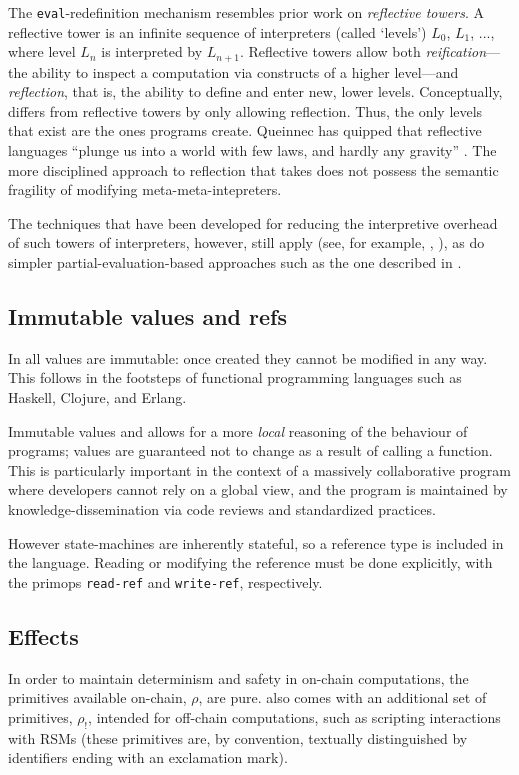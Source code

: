 The \texttt{eval}-redefinition mechanism resembles prior work on
\emph{reflective towers}. A reflective tower is an infinite sequence of
interpreters (called `levels') $L_0$, $L_1$, ..., where level $L_n$ is
interpreted by $L_{n+1}$. Reflective towers allow both \emph{reification}---the
ability to inspect a computation via constructs of a higher level---and
\emph{reflection}, that is, the ability to define and enter new, lower levels.
Conceptually, \rad{} differs from reflective towers by only allowing reflection.
Thus, the only levels that exist are the ones programs create. Queinnec has
quipped that reflective languages ``plunge us into a world with few laws, and
hardly any gravity'' \cite{Queinnec1994}. The more disciplined approach to
reflection that \rad{} takes does not possess the semantic fragility of modifying
meta-meta-intepreters.

The techniques that have been developed for reducing the interpretive overhead
of such towers of interpreters, however, still
apply (see, for example, \cite{Amin2017}, \cite{Asai2014}), as do simpler
partial-evaluation-based approaches such as the one described in \cite{Brown2017}.

\subsection{Immutable values and refs}
In \rad{} all values are immutable: once created they cannot be modified in any
way. This follows in the footsteps of functional programming
languages such as Haskell, Clojure, and Erlang.

Immutable values and allows for a more \textit{local} reasoning of the
behaviour of programs; values are guaranteed not to change as a result of
calling a function. This is particularly important in the context of a
massively collaborative program where developers cannot rely on a global
view, and the program is maintained by knowledge-dissemination via code reviews
and standardized practices.

However state-machines are inherently stateful, so a reference type is included
in the language. Reading or modifying the reference must be done explicitly,
with the primops \texttt{read-ref} and \texttt{write-ref}, respectively.

\subsection{Effects} In order to maintain determinism and safety in on-chain
computations, the primitives available on-chain, $\rho$, are pure. \rad{} also
comes with an additional set of primitives, $\rho_{!}$, intended for off-chain
computations, such as scripting interactions with RSMs (these primitives are,
by convention, textually distinguished by identifiers ending with an exclamation
mark).

